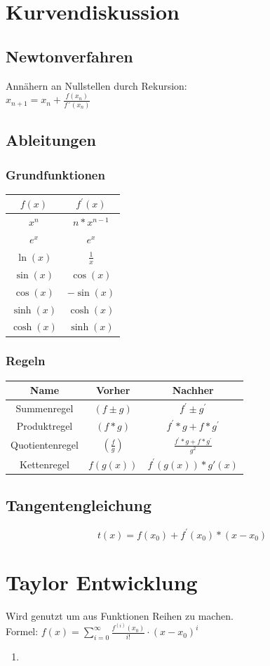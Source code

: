 \documentclass[12pt,a4paper]{article}
\begin{document}
\section{Kurvendiskussion}
	\subsection{Newtonverfahren}
		Annähern an Nullstellen durch Rekursion:\\
		$x_{n+1} = x_n + \frac{f(x_n)}{f´(x_n)}$
		
	\subsection{Ableitungen}
		\subsubsection{Grundfunktionen}
			\begin{tabular}{|c|c|}
				 \hline
				$f(x)$ & $f^{'}(x)$ \\
				\hline
				$x^{n}$ & $n*x^{n-1}$ \\
				\hline
				$e^{x}$ & $e^{x}$ \\
				\hline
				$\ln(x)$ & $\frac{1}{x}$ \\
				\hline
				$\sin{(x)}$ & $\cos{(x)}$ \\
				\hline
				$\cos{(x)}$ & $-\sin{(x)}$ \\
				\hline
				$\sinh{(x)}$ & $\cosh{(x)}$ \\
				\hline
				$\cosh{(x)}$ & $\sinh{(x)}$ \\
				\hline
			\end{tabular}

		\subsubsection{Regeln}
			\begin{tabular}{|c|c|c|}
				 \hline
				Name & Vorher & Nachher \\
				\hline
				Summenregel & $(f\pm g)$ & $f^{'} \pm g^{'}$ \\
				\hline
				Produktregel & $(f*g)$ & $f^{'} *g + f* g^{'}$ \\
				\hline
				Quotientenregel & $(\frac{f}{g})$ & $\frac{f^{'}*g+f*g^{'}}{g^{2}}$ \\
				\hline
				Kettenregel & $f(g(x))$ & $f^{'}(g(x))*g'(x)$ \\
				\hline
			\end{tabular}

	\subsection{Tangentengleichung}
		$$t(x) = f(x_{0}) +f^{'}(x_{0})*(x-x_{0})$$

\section{Taylor Entwicklung}
	Wird genutzt um aus Funktionen Reihen zu machen.\\ 
	Formel: $f(x) = \sum_{i = 0}^{\infty} \frac{f^{(i)}(x_0)}{i!} \cdot (x-x_0)^i$


	\begin{enumerate}
		\item 
	\end{enumerate}
\end{document}
